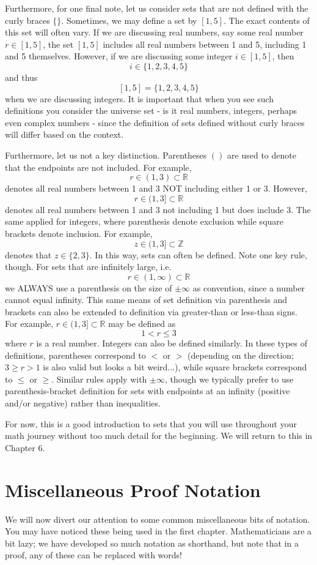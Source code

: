 Furthermore, for one final note, let us consider sets that are not defined with the curly braces $\{ \}$. Sometimes, we may define a set by $[1, 5]$. The exact contents of this set will often vary. If we are discussing real numbers, say some real number $r \in [1, 5]$, the set $[1, 5]$ includes all real numbers between 1 and 5, including 1 and 5 themselves. However, if we are discussing some integer $i \in [1, 5]$, then 
\[
i \in \{ 1, 2, 3, 4, 5 \}
\]
and thus 
\[
[1, 5] = \{ 1, 2, 3, 4, 5 \}
\]
when we are discussing integers. It is important that when you see such definitions you consider the universe set - is it real numbers, integers, perhaps even complex numbers - since the definition of sets defined without curly braces will differ based on the context.

Furthermore, let us not a key distinction. Parentheses $()$ are used to denote that the endpoints are not included. For example,
\[
r \in (1, 3) \subset \mathbb{R}
\]
denotes all real numbers between 1 and 3 NOT including either 1 or 3. However,
\[
r \in (1, 3] \subset \mathbb{R}
\]
denotes all real numbers between 1 and 3 not including 1 but does include 3. The same applied for integers, where parenthesis denote exclusion while square brackets denote inclusion. For example,
\[
z \in (1, 3] \subset \mathbb{Z}
\]
denotes that $z \in \{ 2, 3\}$. In this way, sets can often be defined. Note one key rule, though. For sets that are infinitely large, i.e.
\[
r \in (1, \infty) \subset \mathbb{R}
\]
we ALWAYS use a parenthesis on the size of $\pm \infty$ as convention, since a number cannot equal infinity. This same means of set definition via parenthesis and brackets can also be extended to definition via greater-than or less-than signs. For example, $r \in (1, 3] \subset \mathbb{R}$ may be defined as 
\[
1 < r \leq 3
\]
where $r$ is a real number. Integers can also be defined similarly. In these types of definitions, parentheses correspond to $<$ or $>$ (depending on the direction; $3 \geq r > 1$ is also valid but looks a bit weird...), while square brackets correspond to $\leq$ or $\geq$. Similar rules apply with $\pm \infty$, though we typically prefer to use parenthesis-bracket definition for sets with endpoints at an infinity (positive and/or negative) rather than inequalities.

For now, this is a good introduction to sets that you will use throughout your math journey without too much detail for the beginning. We will return to this in Chapter 6.

\section{Miscellaneous Proof Notation}
We will now divert our attention to some common miscellaneous bits of notation. You may have noticed these being used in the first chapter. Mathematicians are a bit lazy; we have developed so much notation as shorthand, but note that in a proof, any of these can be replaced with words! 

